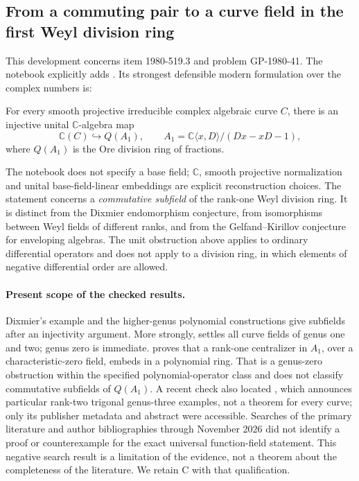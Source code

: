 \subsection{From a commuting pair to a curve field in the first Weyl division ring}
\label{dev:fieldembedding}

This development concerns item 1980-519.3 and problem GP-1980-41. The notebook explicitly adds . Its strongest defensible modern formulation over the complex numbers is:

\begin{conjecture}
For every smooth projective irreducible complex algebraic curve \(C\), there is an injective unital \(\mathbb C\)-algebra map
\[
 \mathbb C(C)\hookrightarrow Q(A_1),\qquad
 A_1=\mathbb C\langle x,D\rangle/(Dx-xD-1),
\]
where \(Q(A_1)\) is the Ore division ring of fractions.
\end{conjecture}

The notebook does not specify a base field; \(\mathbb C\), smooth projective normalization and unital base-field-linear embeddings are explicit reconstruction choices. The statement concerns a \emph{commutative subfield} of the rank-one Weyl division ring. It is distinct from the Dixmier endomorphism conjecture, from isomorphisms between Weyl fields of different ranks, and from the Gelfand--Kirillov conjecture for enveloping algebras. The unit obstruction above applies to ordinary differential operators and does not apply to a division ring, in which elements of negative differential order are allowed.

\paragraph{Present scope of the checked results.}
Dixmier's example and the higher-genus polynomial constructions give subfields after an injectivity argument. More strongly, \citet[Theorem~3(1)--(2)]{oganesyan2016rational} settles all curve fields of genus one and two; genus zero is immediate. \citet[Theorem~1.1]{makarlimanov2021centralizers} proves that a rank-one centralizer in \(A_1\), over a characteristic-zero field, embeds in a polynomial ring. That is a genus-zero obstruction within the specified polynomial-operator class and does not classify commutative subfields of \(Q(A_1)\). A recent check also located \citet[abstract]{ivlev2026trigonal}, which announces particular rank-two trigonal genus-three examples, not a theorem for every curve; only its publisher metadata and abstract were accessible. Searches of the primary literature and author bibliographies through November 2026 did not identify a proof or counterexample for the exact universal function-field statement. This negative search result is a limitation of the evidence, not a theorem about the completeness of the literature. We retain C with that qualification.


